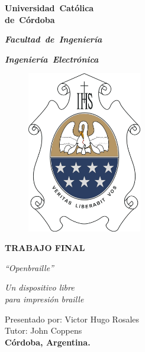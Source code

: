 
\sloppy
\newpage
\thispagestyle{empty}

\begin{center}
  \begin{Huge}
    {\bf \mbox{Universidad Cat\'olica}}\\
    {\bf \mbox{de C\'ordoba}}\\
  \end{Huge}
  \vspace*{0.8cm}

  \begin{huge}
    {\bf \it \mbox{Facultad de Ingenier\'ia}}\\
  \end{huge}
  \vspace*{0.8cm}

  \begin{LARGE}
    {\bf \it \mbox{Ingenier\'ia Electr\'onica}}\\
  \end{LARGE}
  \vspace*{0.8cm}
\end{center}


\begin{figure}[h]
  \centering
  \includegraphics[width=5cm]{./img/escudo_ucc.png}
\end{figure}
\vspace*{0.8cm}

\begin{center}
  \begin{LARGE}
    {\bf TRABAJO FINAL} \\
  \end{LARGE}
  \vspace*{0.5cm}

  \begin{LARGE}
    {\it ``Openbraille''} \\
  \end{LARGE}
  
  \begin{Large}
    {\it Un dispositivo libre} \\
    {\it para impresi\'on braille} \\
  \end{Large}
\end{center}


\begin{center}
  \vspace*{1cm}
  Presentado por: Victor Hugo Rosales\\
  \vspace*{1cm}
  Tutor: John Coppens \\
  {\bf C\'ordoba, Argentina.}
\end{center}
